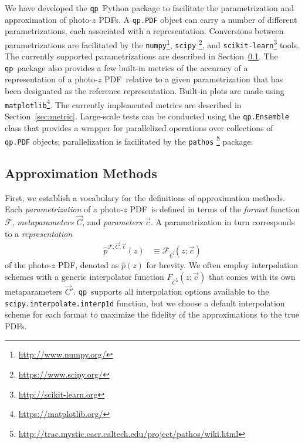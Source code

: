 \documentclass[\docopts]{\docclass}
\newcommand{\qp}{\texttt{qp}}
\newcommand{\pz}{photo-$z$ PDF}
\begin{document}
We have developed the \qp\ Python package to facilitate the parametrization and 
approximation of \pz s.
A \texttt{qp.PDF} object can carry a number of different parametrizations, each 
associated with a representation.
Conversions between parametrizations are facilitated by the 
\texttt{numpy}\footnote{\url{http://www.numpy.org/}}, \texttt{scipy} 
\footnote{\url{https://www.scipy.org/}}, and 
\texttt{scikit-learn}\footnote{\url{http://scikit-learn.org}} 
\citep{pedregosa_scikit-learn:_2011} tools.
The currently supported parametrizations are described in 
Section~\ref{sec:approx}.
The \qp\ package also provides a few built-in metrics of the accuracy of a 
representation of a \pz\ relative to a given parametrization that has been 
designated as the reference representation.
Built-in plots are made using 
\texttt{matplotlib}\footnote{\url{https://matplotlib.org/}}.
The currently implemented metrics are described in Section~\ref{sec:metric}.
Large-scale tests can be conducted using the \texttt{qp.Ensemble} class that 
provides a wrapper for parallelized operations over collections of 
\texttt{qp.PDF} objects; parallelization is facilitated by the \texttt{pathos} 
\footnote{\url{http://trac.mystic.cacr.caltech.edu/project/pathos/wiki.html}} 
\citep{mckerns_building_2012, mckerns_pathos:_2010} package.

\subsection{Approximation Methods}
\label{sec:approx}

First, we establish a vocabulary for the definitions of approximation methods.
Each \textit{parametrization} of a \pz\ is defined in terms of the 
\textit{format} function $\mathcal{F}$, \textit{metaparameters} $\vec{C}$, and 
\textit{parameters} $\vec{c}$.
A parametrization in turn corresponds to a \textit{representation}
\begin{align}
  \label{eq:definition}
  \hat{p}^{\mathcal{F}, \vec{C}, \vec{c}}(z) &\equiv \mathcal{F}_{\vec{C}}(z; 
\vec{c})
\end{align}
of the \pz, denoted as $\hat{p}(z)$ for brevity.
We often employ interpolation schemes with a generic interpolator function 
$F_{\vec{C}'}(z; \vec{c})$ that comes with its own metaparameters $\vec{C}'$.
\qp\ supports all interpolation options available to the 
\texttt{scipy.interpolate.interp1d} function, but we choose a default 
interpolation scheme for each format to maximize the fidelity of the 
approximations to the true PDFs.
\end{document}

